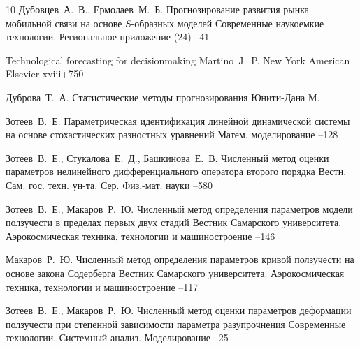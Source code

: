 \begin{thebibliography}{10}
\by Дубовцев~А.~В., Ермолаев~М.~Б.   
\paper Прогнозирование развития рынка мобильной связи на основе $S$-образных моделей 
\jour Современные наукоемкие технологии. Региональное приложение
 (24)
--41
%


\book Technological forecasting for decisionmaking 
\by Martino~J.~P. 
\publaddr New York 
\publ  American Elsevier
\totalpages xviii+750 

\by Дуброва~Т.~А. 
\book Статистические методы прогнозирования
\publ Юнити-Дана
\publaddr М.


\by Зотеев~В.~Е.    
\paper Параметрическая идентификация линейной динамической системы на основе стохастических разностных уравнений
\jour Матем. моделирование
--128

\by Зотеев~В.~Е., Стукалова~Е.~Д., Башкинова~Е.~В.     
\paper Численный метод оценки параметров нелинейного дифференциального оператора второго порядка   
\jour Вестн. Сам. гос. техн. ун-та. Сер. Физ.-мат. науки
--580



\by Зотеев~В.~Е., Макаров~Р.~Ю.    
\paper Численный метод определения параметров модели ползучести в пределах первых двух стадий
\jour Вестник Самарского университета. Аэрокосмическая техника, технологии и машиностроение
--146


\by Макаров~Р.~Ю.    
\paper Численный метод определения параметров кривой ползучести на основе закона Содерберга
\jour Вестник Самарского университета. Аэрокосмическая техника, технологии и машиностроение
--117


\by Зотеев~В.~Е., Макаров~Р.~Ю.    
\paper Численный метод оценки параметров деформации ползучести при степенной зависимости параметра разупрочнения 
\jour Современные технологии. Системный анализ. Моделирование
--25


\end{thebibliography}


